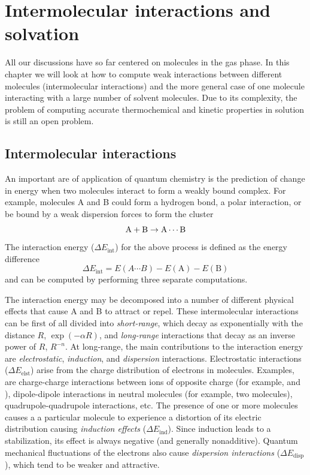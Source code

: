 \documentclass[../Main/chem371-notes.tex]{subfiles}
\begin{document}
\chapter{Intermolecular interactions and solvation}

All our discussions have so far centered on molecules in the gas phase.
In this chapter we will look at how to compute weak interactions between different molecules (intermolecular interactions) and the more general case of one molecule interacting with a large number of solvent molecules.
Due to its complexity, the problem of computing accurate thermochemical and kinetic properties in solution is still an open problem.

\section{Intermolecular interactions}

An important are of application of quantum chemistry is the prediction of change in energy when two molecules interact to form a weakly bound complex.
For example, molecules A and B could form a hydrogen bond, a polar interaction, or be bound by a weak dispersion forces to form the cluster 
\begin{equation}
\ce{A + B} \rightarrow \ce{A\cdots B}
\end{equation}
The interaction energy ($\Delta E_\text{int}$) for the above process is defined as the energy difference
\begin{equation}
\Delta E_\text{int} = E(A\cdots B) - E(\text{A}) - E(\text{B})
\end{equation}
and can be computed by performing three separate computations.

The interaction energy may be decomposed into a number of different physical effects that cause A and B to attract or repel.
These intermolecular interactions can be first of all divided into \emph{short-range}, which decay as exponentially with the distance $R$, $\exp(-\alpha R)$, and \emph{long-range} interactions that decay as an inverse power of $R$, $R^{-n}$.
At long-range, the main contributions to the interaction energy are \emph{electrostatic}, \emph{induction}, and \emph{dispersion} interactions.
Electrostatic interactions ($\Delta E_\text{elst}$) arise from the charge distribution of electrons in molecules.
Examples, are charge-charge interactions between ions of opposite charge (for example,  and ), dipole-dipole interactions in neutral molecules (for example, two  molecules), quadrupole-quadrupole interactions, etc.
The presence of one or more molecules causes a a particular molecule to experience a distortion of its electric distribution causing \emph{induction effects} ($\Delta E_\text{ind}$). Since induction leads to a stabilization, its effect is always negative (and generally nonadditive).
Quantum mechanical fluctuations of the electrons also cause \emph{dispersion interactions} ($\Delta E_\text{disp}$), which tend to be weaker and attractive.
\end{document}
